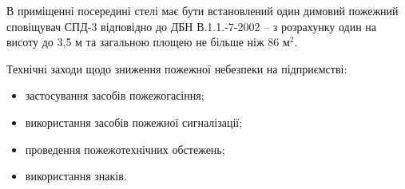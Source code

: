 В приміщенні посередині стелі має бути встановлений один димовий пожежний сповіщувач СПД-3 відповідно до ДБН В.1.1.-7-2002 – з розрахунку один на висоту до 3,5 м та загальною площею не більше ніж 86 м$^2$.

Технічні заходи щодо зниження пожежної небезпеки на підприємстві:
\begin{itemize}
	\item застосування засобів пожежогасіння;
	\item використання засобів пожежної сигналізації;
	\item проведення пожежотехнічних обстежень;
	\item використання знаків.
\end{itemize}
